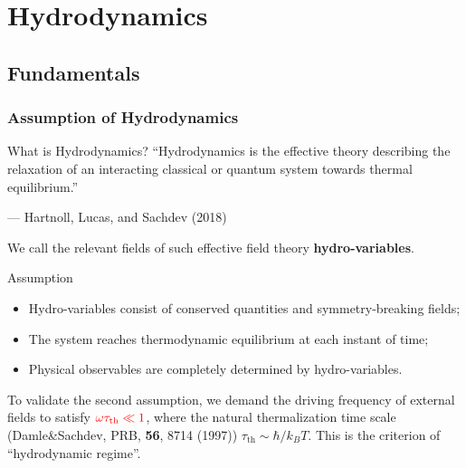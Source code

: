 \documentclass[10pt,aspectratio=43,xcolor=x11names,t]{beamer}%
\begin{document}
\section{Hydrodynamics}
	\subsection{Fundamentals}
		\begin{frame}\frametitle{Assumption of Hydrodynamics}
			\begin{block}{What is Hydrodynamics?}
				``Hydrodynamics is the effective theory describing the relaxation of an interacting classical or quantum system towards thermal equilibrium.''\par\hfill --- {\scriptsize Hartnoll, Lucas, and Sachdev (2018)}
			\end{block}
			We call the relevant fields of such effective field theory \textbf{hydro-variables}.\pause
			\begin{greenblock}{Assumption}
				\begin{itemize}
					\item Hydro-variables consist of conserved quantities and symmetry-breaking fields;
					\item The system reaches thermodynamic equilibrium at each instant of time;
					\item Physical observables are completely determined by hydro-variables.
				\end{itemize}
			\end{greenblock}
			\pause
			To validate the second assumption, we demand the driving frequency of external fields to satisfy ${\color{red}\omega\tau_{\text{th}}\ll1}$, where the natural thermalization time scale ({\scriptsize Damle\&Sachdev, PRB, \textbf{56}, 8714 (1997)}) $\tau_{\text{th}}\sim\hbar/k_B T$. {\color{red}This is the criterion of ``hydrodynamic regime''.}
			
		\end{frame}
		
\end{document}
